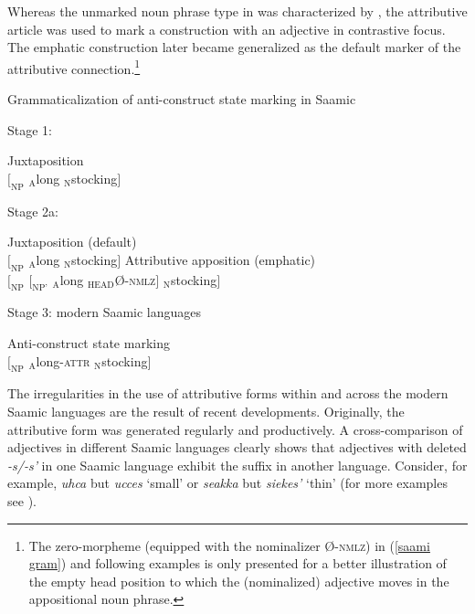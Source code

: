 {Whereas the unmarked noun phrase type in  was characterized by , the attributive article was used to mark a construction with an adjective in contrastive focus. The emphatic construction later became generalized as the default marker of the attributive connection.\footnote{The zero-morpheme (equipped with the nominalizer Ø-\textsc{nmlz}) in (\ref{saami gram}) and following examples is only presented for a better illustration of the empty head position to which the (nominalized) adjective moves in the appositional noun phrase.}
\begin{exe}
\label{saami gram}
\ex \rm{Grammaticalization of anti\hyp{}construct state marking in Saamic} 
\begin{xlist}
\ex \rm{Stage 1: }
\begin{xlist}
\ex \rm{Juxtaposition}\\
	$[_{\text{NP}}$ $_{\text{A}}$long $_{\text{N}}$stocking$]$
\end{xlist}
\ex \rm{Stage 2a: }
\begin{xlist}
\ex \rm{Juxtaposition (default)}\\
	$[_{\text{NP}}$ $_{\text{A}}$long $_{\text{N}}$stocking$]$
\ex \rm{Attributive apposition (emphatic)}\\
	$[_{\text{NP}}$ $[_{\text{NP'}}$ $_{\text{A}}$long $_{\text{HEAD}}$Ø-\textsc{nmlz}$]$ $_{\text{N}}$stocking$]$
\end{xlist}
\ex \rm{Stage 3: modern Saamic languages}
\begin{xlist}
\ex \rm{Anti\hyp{}construct state marking}\\
	$[_{\text{NP}}$ $_{\text{A}}$long-\textsc{attr} $_{\text{N}}$stocking$]$
\end{xlist}
\end{xlist}
\end{exe}
The irregularities in the use of attributive forms within and across the modern Saamic languages are the result of recent developments. Originally, the attributive form was generated regularly and productively. A cross-comparison of adjectives in different Saamic languages clearly shows that adjectives with deleted \textit{-s/-s'} in one Saamic language exhibit the suffix in another language. Consider, for example,  \textit{uhca} but  \textit{ucces} ‘small’ or  \textit{seakka} but  \textit{sie{\ng}{\ng}kes'} ‘thin’ (for more examples see \citealt{riesler2006b}).

}
